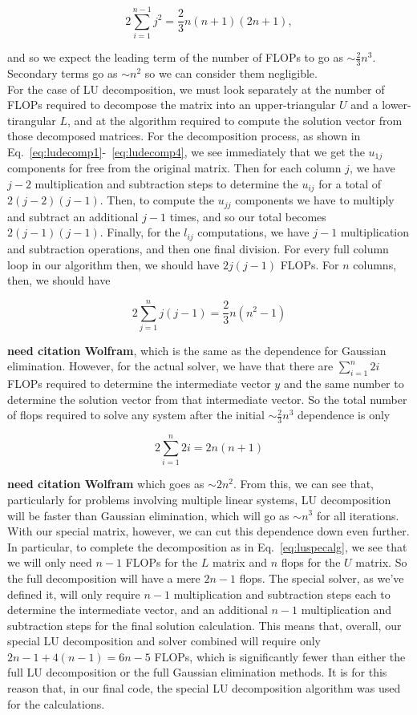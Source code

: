 \documentclass[12pt]{article}
\numberwithin{equation}{section}
\begin{document}
$$2\sum_{i=1}^{n-1}j^{2} = \frac{2}{3}n\left(n+1\right)\left(2n+1\right),$$

\noindent and so we expect the leading term of the number of FLOPs to go as $\sim\frac{2}{3}n^{3}$.  Secondary terms go as $\sim n^{2}$ so we can consider them negligible.
\\\indent For the case of LU decomposition, we must look separately at the number of FLOPs required to decompose the matrix into an upper-triangular $U$ and a lower-tirangular $L$, and at the algorithm required to compute the solution vector from those decomposed matrices.  For the decomposition process, as shown in Eq.~\ref{eq:ludecomp1}-~\ref{eq:ludecomp4}, we see immediately that we get the $u_{1j}$ components for free from the original matrix.  Then for each column $j$, we have $j-2$ multiplication and subtraction steps to determine the $u_{ij}$ for a total of $2\left(j-2\right)\left(j-1\right)$.  Then, to compute the $u_{jj}$ components we have to multiply and subtract an additional $j-1$ times, and so our total becomes $2\left(j-1\right)\left(j-1\right)$.  Finally, for the $l_{ij}$ computations, we have $j-1$ multiplication and subtraction operations, and then one final division.  For every full column loop in our algorithm then, we should have $2j\left(j-1\right)$ FLOPs.  For $n$ columns, then, we should have 

$$2\sum_{j=1}^{n}j\left(j-1\right) = \frac{2}{3}n\left(n^{2}-1\right)$$

\noindent\textbf{need citation Wolfram}, which is the same as the dependence for Gaussian elimination.  However, for the actual solver, we have that there are $\sum_{i=1}^{n}2i$ FLOPs required to determine the intermediate vector $y$ and the same number to determine the solution vector from that intermediate vector.  So the total number of flops required to solve any system after the initial $\sim\frac{2}{3}n^{3}$ dependence is only 

$$2\sum_{i=1}^{n}2i = 2n\left(n+1\right)$$

\noindent\textbf{need citation Wolfram} which goes as $\sim2n^{2}$.  From this, we can see that, particularly for problems involving multiple linear systems, LU decomposition will be faster than Gaussian elimination, which will go as $\sim n^{3}$ for all iterations.
\\\indent With our special matrix, however, we can cut this dependence down even further.  In particular, to complete the decomposition as in Eq.~\ref{eq:luspecalg}, we see that we will only need $n-1$ FLOPs for the $L$ matrix and $n$ flops for the $U$ matrix.  So the full decomposition will have a mere $2n-1$ flops.  The special solver, as we've defined it, will only require $n-1$ multiplication and subtraction steps each to determine the intermediate vector, and an additional $n-1$ multiplication and subtraction steps for the final solution calculation.  This means that, overall, our special LU decomposition and solver combined will require only $2n-1+4\left(n-1\right) = 6n-5$ FLOPs, which is significantly fewer than either the full LU decomposition or the full Gaussian elimination methods.  It is for this reason that, in our final code, the special LU decomposition algorithm was used for the calculations.
\end{document}
